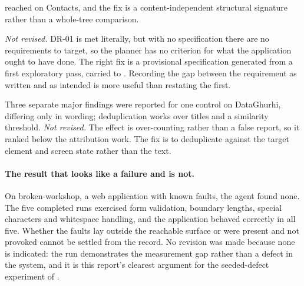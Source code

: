 \begin{description}[leftmargin=2.6em,style=nextline,itemsep=5pt,topsep=4pt]
    reached on Contacts, and the fix is a content-independent structural
    signature rather than a whole-tree comparison.
  \item[D5. Quality degrades sharply without a specification.] \emph{Not
    revised.} DR-01 is met literally, but with no specification there are no
    requirements to target, so the planner has no criterion for what the
    application ought to have done. The right fix is a provisional
    specification generated from a first exploratory pass, carried to
    . Recording the gap between the requirement as written
    and as intended is more useful than restating the first.
  \item[D6. Duplicate findings survive deduplication.] Three separate major
    findings were reported for one control on DataGhurhi, differing only in
    wording; deduplication works over titles and a similarity threshold.
    \emph{Not revised.} The effect is over-counting rather than a false report,
    so it ranked below the attribution work. The fix is to deduplicate against
    the target element and screen state rather than the text.
\end{description}

\paragraph{The result that looks like a failure and is not.} On
broken-workshop, a web application with known faults, the agent found none. The
five completed runs exercised form validation, boundary lengths, special
characters and whitespace handling, and the application behaved correctly in
all five. Whether the faults lay outside the reachable surface or were present
and not provoked cannot be settled from the record. No revision was made
because none is indicated: the run demonstrates the measurement gap rather than
a defect in the system, and it is this report's clearest argument for the
seeded-defect experiment of .
